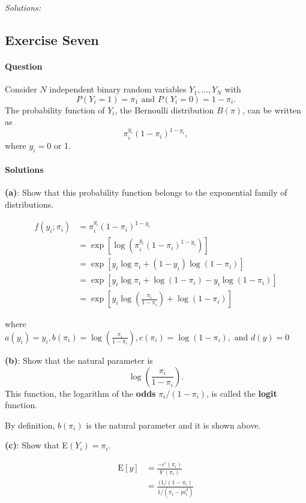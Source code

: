 \documentclass[]{article}
\let\oldparagraph\paragraph
\renewcommand{\paragraph}[1]{\oldparagraph{#1}\mbox{}}
\begin{document}
\emph{Solutions: }

\pagebreak

\subsection{Exercise Seven}\label{exercise-seven}

\paragraph{Question}\label{question-3}

Consider \(N\) independent binary random variables \(Y_1,...,Y_N\) with
\[P(Y_i = 1) = \pi_1 \text{ and } P(Y_i = 0) = 1 - \pi_i.\] The
probability function of \(Y_i\), the Bernoulli distribution \(B(\pi)\),
can be written as \[\pi_i^{y_i} (1 - \pi_i)^{1 - y_i},\] where
\(y_i = 0\) or 1.

\paragraph{Solutions}\label{solutions-3}

\textbf{(a)}: Show that this probability function belongs to the
exponential family of distributions.

\begin{align*}
f(y_i; \pi_i) &= \pi_i^{y_i} (1 - \pi_i)^{1 - y_i}\\
              &= \exp[\log(\pi_i^{y_i} (1 - \pi_i)^{1 - y_i})]\\
              &= \exp[y_i\log\pi_i + (1-y_i)\log(1-\pi_i)]\\
              &= \exp[y_i\log\pi_i + \log(1-\pi_i) - y_i\log(1-\pi_i)]\\
              &= \exp[y_i\log\left(\frac{\pi_i}{1-\pi_i}\right) + \log(1-\pi_i)]
\end{align*}

where
\(a(y_i) = y_i, b(\pi_i) = \log\left(\frac{\pi_i}{1-\pi_i}\right), c(\pi_i) = \log(1-\pi_i),\text{ and } d(y) = 0\)

\textbf{(b)}: Show that the natural parameter is
\[\log \left(\frac{\pi_i}{1 - \pi_i}\right).\] This function, the
logarithm of the \textbf{odds} \(\pi_i/(1 - \pi_i)\), is called the
\textbf{logit} function.

By definition, \(b(\pi_i)\) is the natural parameter and it is shown
above.

\textbf{(c)}: Show that E\((Y_i) = \pi_i\).

\begin{align*}
\text{E}[y] &= \frac{-c'(\pi_i)}{b'(\pi_i)}\\
            &= \frac{(1/(1-\pi_i)}{1/(\pi_i-pi_i^2)}\\
\end{align*}
\end{document}
